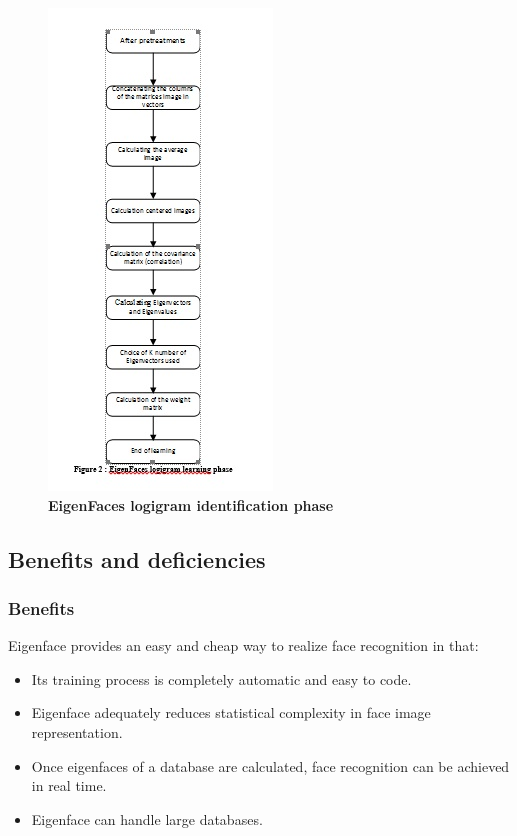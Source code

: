 \begin{figure}[bth]%
\begin{center}
\includegraphics[scale=0.75]{ef_learningphase}%
\caption{\textbf{EigenFaces logigram identification phase}}%
\label{ef_idphase}%
\end {center}
\end{figure}	

\subsection{Benefits and deficiencies}	
\subsubsection{Benefits}	
Eigenface provides an easy and cheap way to realize face recognition in that:
\begin{itemize}
\item Its training process is completely automatic and easy to code. 
\item Eigenface adequately reduces statistical complexity in face image representation.
\item Once eigenfaces of a database are calculated, face recognition can be achieved in real time.
\item Eigenface can handle large databases.
\end{itemize}


